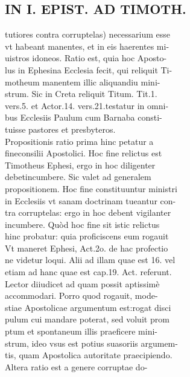 \documentclass{article}
\begin{document}
\begin{pages}
\section*{IN I. EPIST. AD TIMOTH. \\
                }
tutiores contra corruptelas) necessarium esse \\
                vt habeant manentes, et in eis haerentes mi- \\
                uistros idoneos. Ratio est, quia hoc Aposto- \\
                lus in Ephesina Ecclesia fecit, qui reliquit Ti- \\
                motheum manentem illic aliquandiu mini- \\
                strum. Sic in Creta reliquit Titum. Tit.1. \\
                vers.5. et Actor.14. vers.21.testatur in omni- \\
                bus Ecclesiis Paulum cum Barnaba consti- \\
                tuisse pastores et presbyteros. \\
                Propositionis ratio prima hinc petatur a \\
                fineconsilii Apostolici. Hoc fine relictus est \\
                Timotheus Ephesi, ergo in hoc diligenter \\
                debetincumbere. Sic valet ad generalem \\
                propositionem. Hoc fine constituuntur ministri \\
                in Ecclesiis vt sanam doctrinam tueantur con- \\
                tra corruptelas: ergo in hoc debent vigilanter \\
                incumbere. Quòd hoc fine sit istic relictus \\
                hinc probatur: quia proficiscens eum rogauit \\
                Vt maneret Ephesi, Act.2o. de hac profectio \\
                ne videtur loqui. Alii ad illam quae est 16. vel \\
                etiam ad hanc quae est cap.19. Act. referunt. \\
                Lector diiudicet ad quam possit aptissimè \\
                accommodari. Porro quod rogauit, mode- \\
                stiae Apostolicae argumentum est:rogat disci \\
                pulum cui mandare poterat, sed voluit prom \\
                ptum et spontaneum illis praeficere mini- \\
                strum, ideo vsus est potius suasoriis argumem- \\
                tis, quam Apostolica autoritate praecipiendo. \\
                Altera ratio est a genere corruptae do- \\
                

\end{pages}
\end{document}
